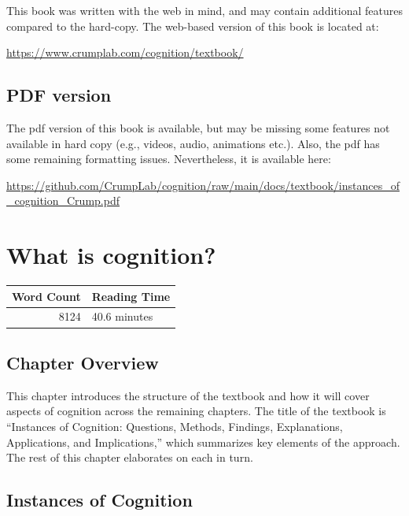 \documentclass[
  oneside,
  12pt]{crumpbook}
\begin{document}
This book was written with the web in mind, and may contain additional features compared to the hard-copy. The web-based version of this book is located at:

\url{https://www.crumplab.com/cognition/textbook/}

\hypertarget{pdf-version}{%
\section{PDF version}\label{pdf-version}}

The pdf version of this book is available, but may be missing some features not available in hard copy (e.g., videos, audio, animations etc.). Also, the pdf has some remaining formatting issues. Nevertheless, it is available here:

\url{https://github.com/CrumpLab/cognition/raw/main/docs/textbook/instances_of_cognition_Crump.pdf}

\hypertarget{what-is-cognition}{%
\chapter{What is cognition?}\label{what-is-cognition}}

\begin{tabular}{r|l}
\hline
Word Count & Reading Time\\
\hline
8124 & 40.6 minutes\\
\hline
\end{tabular}

\hypertarget{chapter-overview}{%
\section{Chapter Overview}\label{chapter-overview}}

This chapter introduces the structure of the textbook and how it will cover aspects of cognition across the remaining chapters. The title of the textbook is ``Instances of Cognition: Questions, Methods, Findings, Explanations, Applications, and Implications,'' which summarizes key elements of the approach. The rest of this chapter elaborates on each in turn.

\hypertarget{instances-of-cognition}{%
\section{Instances of Cognition}\label{instances-of-cognition}}
\end{document}
